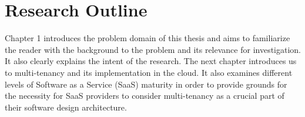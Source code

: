 \section{Research Outline}

Chapter 1 introduces the problem domain of this thesis and aims to familiarize the reader with the background to the problem and its relevance for investigation. It also clearly explains the intent of the research. The next chapter introduces us to multi-tenancy and its implementation in the cloud. It also examines different levels of Software as a Service (SaaS) maturity in order to provide grounds for the necessity for SaaS providers to consider multi-tenancy as a crucial part of their software design architecture.